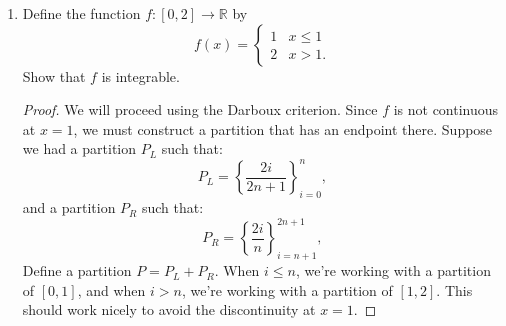 \documentclass[12pt]{amsart}
\begin{document}
\begin{enumerate}
\begin{proof}
\bigskip

%
We're halfway there. Now we must show that:
%
\[ \inf\{ U(f, Q_n) : n\in\mathbb N \} = \frac 2 3. \]
%
Again, since $f$ is increasing, we have that:
%
\[ f(x_i) = M_i(f,Q_n) = \sqrt{\left(\frac{i}{n}\right)^2} = \frac{i}{n}. \]
%
So,
%
\[ U(f,Q_n) = \sum_{i=1}^n \frac i n \Delta x_i = \sum_{i=1}^n \frac i n \cdot \frac{2i-1}{n^2}, \]
%
which is the same as saying,
%
\[ = \sum_{i=1}^n \frac{2i^2-i}{n^3} = \sum_{i=1}^n \frac 2 {n^2} i^2 -  \sum_{i=1}^n \frac 1 {n^3} i. \]
%
Again, by pulling out the constant term we're left with the summations of $i^2$ and $i$, so we can apply their formulae and get:
%
\[ = \frac 2 {n^3}\cdot\frac{n\cdot(n+1)\cdot(2n+1)}{6} - \frac 1 {n^3}\cdot\frac{n\cdot(n+1)}{2}.\]
%
Now we can combine terms to get:
%
\[ = \frac{2\cdot(n+1)\cdot(2n+1)-3\cdot(n+1)}{6n^2} = \frac{4n^2+3n-1}{6n^2}. \]
%
Finally, we split up this fraction:
%
\[ = \frac 2 3 + \frac 1 {2n} - \frac 1 {6n^2}. \]
%
As $n$ gets very large, the second two terms go to zero. In other words,
%
\[ \inf\{ U(f, Q_n) : n\in\mathbb N \} = \frac 2 3, \]
%
which is exactly what we wanted to show.

\bigskip

Hence,
%
\[ U(f,Q_n) - L(f,Q_n)= \frac 2 3 - \frac 2 3 = 0, \]
%
so $f$ is integrable and its value is $2/3$.
\end{proof}

\item Define the function $f : [0,2] \rightarrow \mathbb{R}$ by
%
\[ f(x) = \begin{cases} 1  & x\leq 1 \\ 2 & x> 1. \end{cases} \]
%
Show that $f$ is integrable.
%

\begin{proof}
We will proceed using the Darboux criterion. Since $f$ is not continuous at $x=1$, we must construct a partition that has an endpoint there. Suppose we had a partition $P_L$ such that:
%
\[ P_L = \left\{ \frac {2i}{2n+1} \right\}_{i=0}^{n}, \]
%
and a partition $P_R$ such that:
%
\[ P_R = \left\{ \frac {2i}{n} \right\}_{i=n+1}^{2n+1}, \]
%
Define a partition $P = P_L + P_R$. When $i\le n$, we're working with a partition of $[0,1]$, and when $i > n$, we're working with a partition of $[1,2]$. This should work nicely to avoid the discontinuity at $x=1$.


\end{proof}
\end{enumerate}
\end{document}
